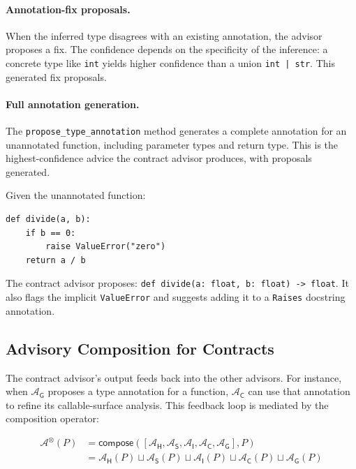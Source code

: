 \documentclass[11pt]{article}
\newcommand{\Adv}{\mathcal{A}}
\newcommand{\AdvH}{\Adv_{\mathsf{H}}}
\newcommand{\AdvS}{\Adv_{\mathsf{S}}}
\newcommand{\AdvI}{\Adv_{\mathsf{I}}}
\newcommand{\AdvC}{\Adv_{\mathsf{C}}}
\newcommand{\AdvG}{\Adv_{\mathsf{G}}}
\newcommand{\AdvComp}{\Adv^{\otimes}}
\newcommand{\ComposeOp}{\mathsf{compose}}
\begin{document}
\paragraph{Annotation-fix proposals.}
When the inferred type disagrees with an existing annotation, the
advisor proposes a fix.  The confidence depends on the specificity
of the inference: a concrete type like \texttt{int} yields higher
confidence than a union \texttt{int | str}.
This generated \ppXCcontractFixAnnotations{} fix proposals.

\paragraph{Full annotation generation.}
The \texttt{propose\_type\_annotation} method generates a complete
annotation for an unannotated function, including parameter types
and return type.  This is the highest-confidence advice the contract
advisor produces, with \ppXCcontractProposals{} proposals generated.

\begin{example}\label{ex:contract}
Given the unannotated function:
\begin{lstlisting}[style=jugeo-python]
def divide(a, b):
    if b == 0:
        raise ValueError("zero")
    return a / b
\end{lstlisting}
The contract advisor proposes:
\texttt{def divide(a: float, b: float) -> float}.
It also flags the implicit \texttt{ValueError} and suggests adding
it to a \texttt{Raises} docstring annotation.
\end{example}

\subsection{Advisory Composition for Contracts}\label{sec:contract-compose}

The contract advisor's output feeds back into the other advisors.
For instance, when $\AdvG$ proposes a type annotation for a function,
$\AdvC$ can use that annotation to refine its callable-surface
analysis.  This feedback loop is mediated by the composition operator:

\begin{align}
  \AdvComp(P)
  &= \ComposeOp([\AdvH, \AdvS, \AdvI, \AdvC, \AdvG], P) \\
  &= \AdvH(P) \sqcup \AdvS(P) \sqcup \AdvI(P) \sqcup \AdvC(P) \sqcup \AdvG(P)
\end{align}
\end{document}
